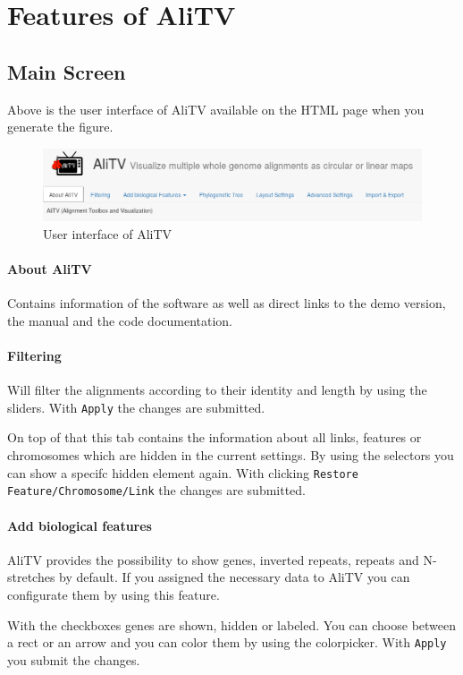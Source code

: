\documentclass[a4paper]{scrartcl}
\begin{document}
\newpage
\section*{Features of AliTV}
\subsection*{Main Screen}
Above is the user interface of AliTV available on the HTML page when you generate the figure.
\begin{figure}[H]
	\centering
	\includegraphics[width=14cm]{userInterface.png}
	\caption{User interface of AliTV}
\end{figure}
\paragraph*{About AliTV}
Contains information of the software as well as direct links to the demo version, the manual and the code documentation.

\paragraph*{Filtering}
Will filter the alignments according to their identity and length by using the sliders. With \texttt{Apply} the changes are submitted.

On top of that this tab contains the information about all links, features or chromosomes which are hidden in the current settings. By using the selectors you can show a specifc hidden element again. With clicking \texttt{Restore Feature/Chromosome/Link} the changes are submitted.

\paragraph*{Add biological features}
AliTV provides the possibility to show genes, inverted repeats, repeats and N-stretches by default. If you assigned the necessary data to AliTV you can configurate them by using this feature. 

With the checkboxes genes are shown, hidden or labeled. You can choose between a rect or an arrow and you can color them by using the colorpicker. With \texttt{Apply} you submit the changes.
\end{document}

